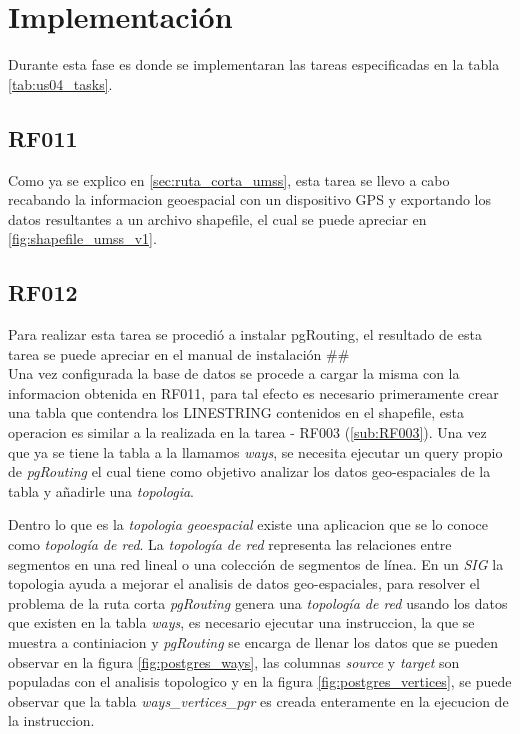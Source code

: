     


\section{Implementación}
\label{sec:implementacion_iteracion_1}

Durante esta fase es donde se implementaran las tareas especificadas en la tabla \ref{tab:us04_tasks}.

\subsection{RF011}
\label{sub:RF011}


Como ya se explico en \ref{sec:ruta_corta_umss}, esta tarea se llevo a cabo recabando la informacion geoespacial con un dispositivo GPS y exportando los datos resultantes a un archivo shapefile, el cual se puede apreciar en \ref{fig:shapefile_umss_v1}.

\subsection{RF012}
\label{sub:RF012}


Para realizar esta tarea se procedió a instalar pgRouting, el resultado de esta tarea se puede apreciar en el manual de instalación ## \\

Una vez configurada la base de datos se procede a cargar la misma con la informacion obtenida en RF011, para tal efecto es necesario primeramente crear una tabla que contendra los LINESTRING contenidos en el shapefile, esta operacion es similar a la realizada en la tarea - RF003 (\ref{sub:RF003}). Una vez que ya se tiene la tabla a la llamamos \emph{ways}, se necesita ejecutar un query propio de \emph{pgRouting} el cual tiene como objetivo analizar los datos geo-espaciales de la tabla y a\~nadirle una \emph{topologia}.

Dentro lo que es la \emph{topologia geoespacial} existe una aplicacion que se lo conoce como \emph{topología de red}. La \emph{topología de red} representa las relaciones entre segmentos en una red lineal o una colección de segmentos de línea\cite{osgeo_journal_topology}.
En un \emph{SIG} la topologia ayuda a mejorar el analisis de datos geo-espaciales, para resolver el problema de la ruta corta \emph{pgRouting} genera una \emph{topología de red} usando los datos que existen en la tabla \emph{ways}, es necesario ejecutar una instruccion, la que se muestra a continiacion y \emph{pgRouting} se encarga de llenar los datos que se pueden observar en la figura \ref{fig:postgres_ways}, las columnas \emph{source} y \emph{target} son populadas con el analisis topologico y en la figura \ref{fig:postgres_vertices}, se puede observar que la tabla \emph{ways\_vertices\_pgr} es creada enteramente en la ejecucion de la instruccion.

